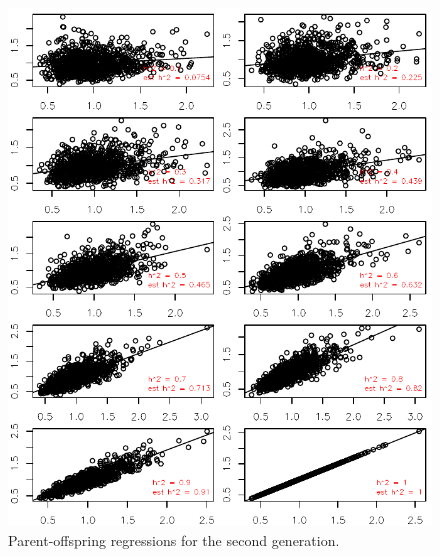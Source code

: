 \documentclass[12pt,reqno,final,pdftex]{amsart}\usepackage[]{graphicx}\usepackage[]{color}
\newenvironment{knitrout}{}{} %
\theoremstyle{plain}
\numberwithin{equation}{part}
\begin{document}
\begin{knitrout}\scriptsize
{}\color{fgcolor}\begin{figure}

\includegraphics[width=\linewidth]{figure/unnamed-chunk-3-1} \hfill{}

\caption[Parent-offspring regressions for the second generation]{Parent-offspring regressions for the second generation.}\label{fig:unnamed-chunk-3}
\end{figure}


\end{knitrout}
\end{document}
